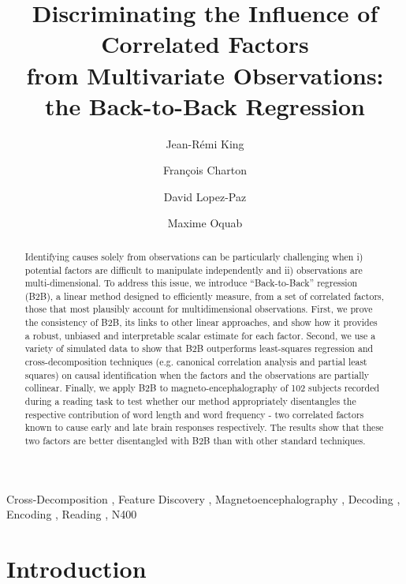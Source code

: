 \documentclass[preprint,12pt,3p]{elsarticle}
\begin{document}
\begin{frontmatter}

\title{Discriminating the Influence of Correlated Factors \\from Multivariate Observations: the Back-to-Back Regression}

\author[1,2]{Jean-Rémi King}

\author[2]{Fran\c{c}ois Charton}
\author[2]{David Lopez-Paz}
\author[2]{Maxime Oquab}
\address[1]{Laboratoire des systèmes perceptifs, PSL University, CNRS}
\address[2]{Facebook AI}


\begin{abstract}
Identifying causes solely from observations can be particularly challenging when
i) potential factors are difficult to manipulate independently and ii)
observations are multi-dimensional. To address this issue, we
introduce ``Back-to-Back'' regression (B2B), a linear method designed to efficiently
measure, from a set of correlated factors, those that most plausibly account for
multidimensional observations. First, we prove the consistency of B2B, its links to
other linear approaches, and show how it provides a robust, unbiased and
interpretable scalar estimate for each factor.
Second, we use a variety of simulated data to show that B2B outperforms
least-squares regression and cross-decomposition techniques (e.g. canonical
correlation analysis and partial least squares) on causal identification when
the factors and the observations are partially collinear.
Finally, we apply B2B to magneto-encephalography of 102 subjects
recorded during a reading task to test whether our method appropriately disentangles
the respective contribution of word length and word frequency - two correlated
factors known to cause early and late brain responses respectively. The results
show that these two factors are better disentangled with B2B than with
other standard techniques.
\end{abstract}


\begin{keyword}
  Cross-Decomposition \sep
  Feature Discovery \sep
  Magnetoencephalography \sep
  Decoding \sep
  Encoding \sep
  Reading \sep
  N400
\end{keyword}

\end{frontmatter}

\linenumbers

\section{Introduction}
\end{document}
